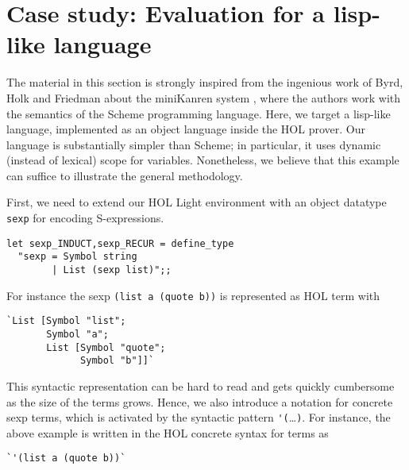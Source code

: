 

\section{Case study: Evaluation for a lisp-like language}
\label{sec:lisp-eval}

The material in this section is strongly inspired from the ingenious
work of Byrd, Holk and Friedman about the miniKanren system
\citep{Byrd:2012:MLU:2661103.2661105}, where the authors work with the
semantics of the Scheme programming language. Here, we target a lisp-like
language, implemented as an object language inside the HOL prover.
Our language is substantially simpler than Scheme; in
particular, it uses dynamic (instead of lexical) scope for variables.
Nonetheless, we believe that this example can suffice to illustrate
the general methodology.

First, we need to extend our HOL Light environment with an object
datatype \verb|sexp| for encoding S-expressions.
\begin{verbatim}
let sexp_INDUCT,sexp_RECUR = define_type
  "sexp = Symbol string
        | List (sexp list)";;
\end{verbatim}
For instance the sexp \verb|(list a (quote b))| is represented as HOL
term with
\begin{verbatim}
`List [Symbol "list";
       Symbol "a";
       List [Symbol "quote";
             Symbol "b"]]`
\end{verbatim}
This syntactic representation can be hard to read and gets quickly
cumbersome as the size of the terms grows.  Hence, we also introduce a
notation for concrete sexp terms, which is activated by the syntactic
pattern \verb|'(|\ldots\verb|)|.  For instance, the above example
is written in the HOL concrete syntax for terms as
\begin{verbatim}
`'(list a (quote b))`
\end{verbatim}

